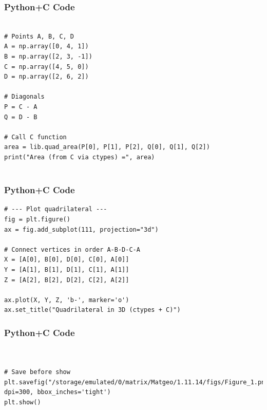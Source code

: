 \documentclass{beamer}
\begin{document}
\begin{frame}[fragile]
    \frametitle{Python+C Code}
    \begin{lstlisting}

# Points A, B, C, D
A = np.array([0, 4, 1])
B = np.array([2, 3, -1])
C = np.array([4, 5, 0])
D = np.array([2, 6, 2])

# Diagonals
P = C - A
Q = D - B

# Call C function
area = lib.quad_area(P[0], P[1], P[2], Q[0], Q[1], Q[2])
print("Area (from C via ctypes) =", area)


    \end{lstlisting}
\end{frame}

\begin{frame}[fragile]
    \frametitle{Python+C Code}
    \begin{lstlisting}
# --- Plot quadrilateral ---
fig = plt.figure()
ax = fig.add_subplot(111, projection="3d")

# Connect vertices in order A-B-D-C-A
X = [A[0], B[0], D[0], C[0], A[0]]
Y = [A[1], B[1], D[1], C[1], A[1]]
Z = [A[2], B[2], D[2], C[2], A[2]]

ax.plot(X, Y, Z, 'b-', marker='o')
ax.set_title("Quadrilateral in 3D (ctypes + C)")
    \end{lstlisting}
\end{frame}


\begin{frame}[fragile]
    \frametitle{Python+C Code}
    \begin{lstlisting}


# Save before show
plt.savefig("/storage/emulated/0/matrix/Matgeo/1.11.14/figs/Figure_1.png", dpi=300, bbox_inches='tight')
plt.show()
    \end{lstlisting}
\end{frame}
\end{document}
